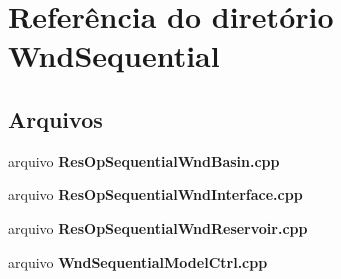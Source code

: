 \section{Referência do diretório Wnd\+Sequential}
\label{dir_cf53cf3b75036a47b7824870a4f40c91}
\subsection*{Arquivos}
\begin{DoxyCompactItemize}
\item 
arquivo {\bf Res\+Op\+Sequential\+Wnd\+Basin.\+cpp}
\item 
arquivo {\bf Res\+Op\+Sequential\+Wnd\+Interface.\+cpp}
\item 
arquivo {\bf Res\+Op\+Sequential\+Wnd\+Reservoir.\+cpp}
\item 
arquivo {\bf Wnd\+Sequential\+Model\+Ctrl.\+cpp}
\end{DoxyCompactItemize}

